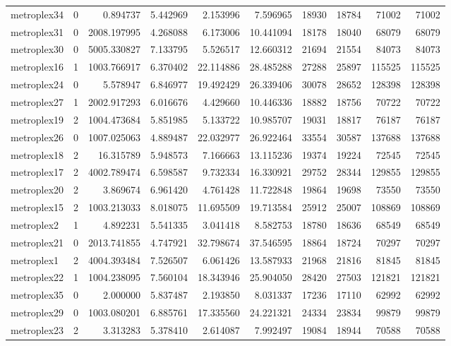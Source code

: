 \begin{longtable}{|l|r|r|r|r|r|r|r|r|r|}
metroplex34 & 0 & 0.894737 & 5.442969 & 2.153996 & 7.596965 & 18930 & 18784 & 71002 & 71002 \\
metroplex31 & 0 & 2008.197995 & 4.268088 & 6.173006 & 10.441094 & 18178 & 18040 & 68079 & 68079 \\
metroplex30 & 0 & 5005.330827 & 7.133795 & 5.526517 & 12.660312 & 21694 & 21554 & 84073 & 84073 \\
metroplex16 & 1 & 1003.766917 & 6.370402 & 22.114886 & 28.485288 & 27288 & 25897 & 115525 & 115525 \\
metroplex24 & 0 & 5.578947 & 6.846977 & 19.492429 & 26.339406 & 30078 & 28652 & 128398 & 128398 \\
metroplex27 & 1 & 2002.917293 & 6.016676 & 4.429660 & 10.446336 & 18882 & 18756 & 70722 & 70722 \\
metroplex19 & 2 & 1004.473684 & 5.851985 & 5.133722 & 10.985707 & 19031 & 18817 & 76187 & 76187 \\
metroplex26 & 0 & 1007.025063 & 4.889487 & 22.032977 & 26.922464 & 33554 & 30587 & 137688 & 137688 \\
metroplex18 & 2 & 16.315789 & 5.948573 & 7.166663 & 13.115236 & 19374 & 19224 & 72545 & 72545 \\
metroplex17 & 2 & 4002.789474 & 6.598587 & 9.732334 & 16.330921 & 29752 & 28344 & 129855 & 129855 \\
metroplex20 & 2 & 3.869674 & 6.961420 & 4.761428 & 11.722848 & 19864 & 19698 & 73550 & 73550 \\
metroplex15 & 2 & 1003.213033 & 8.018075 & 11.695509 & 19.713584 & 25912 & 25007 & 108869 & 108869 \\
metroplex2 & 1 & 4.892231 & 5.541335 & 3.041418 & 8.582753 & 18780 & 18636 & 68549 & 68549 \\
metroplex21 & 0 & 2013.741855 & 4.747921 & 32.798674 & 37.546595 & 18864 & 18724 & 70297 & 70297 \\
metroplex1 & 2 & 4004.393484 & 7.526507 & 6.061426 & 13.587933 & 21968 & 21816 & 81845 & 81845 \\
metroplex22 & 1 & 1004.238095 & 7.560104 & 18.343946 & 25.904050 & 28420 & 27503 & 121821 & 121821 \\
metroplex35 & 0 & 2.000000 & 5.837487 & 2.193850 & 8.031337 & 17236 & 17110 & 62992 & 62992 \\
metroplex29 & 0 & 1003.080201 & 6.885761 & 17.335560 & 24.221321 & 24334 & 23834 & 99879 & 99879 \\
metroplex23 & 2 & 3.313283 & 5.378410 & 2.614087 & 7.992497 & 19084 & 18944 & 70588 & 70588 \\

\end{longtable}
